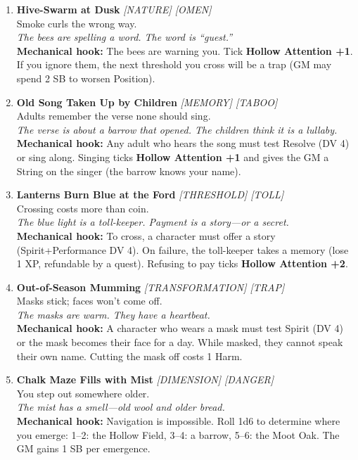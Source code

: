 \begin{enumerate}
\item \textbf{Hive-Swarm at Dusk} \hfill \textit{[NATURE] [OMEN]} \\
  Smoke curls the wrong way. \\
  \textit{The bees are spelling a word. The word is ``guest.''} \\
  \textbf{Mechanical hook:} The bees are warning you. Tick \textbf{Hollow Attention +1}. If you ignore them, the next threshold you cross will be a trap (GM may spend 2 SB to worsen Position).

\item \textbf{Old Song Taken Up by Children} \hfill \textit{[MEMORY] [TABOO]} \\
  Adults remember the verse none should sing. \\
  \textit{The verse is about a barrow that opened. The children think it is a lullaby.} \\
  \textbf{Mechanical hook:} Any adult who hears the song must test Resolve (DV 4) or sing along. Singing ticks \textbf{Hollow Attention +1} and gives the GM a String on the singer (the barrow knows your name).

\item \textbf{Lanterns Burn Blue at the Ford} \hfill \textit{[THRESHOLD] [TOLL]} \\
  Crossing costs more than coin. \\
  \textit{The blue light is a toll-keeper. Payment is a story---or a secret.} \\
  \textbf{Mechanical hook:} To cross, a character must offer a story (Spirit+Performance DV 4). On failure, the toll-keeper takes a memory (lose 1 XP, refundable by a quest). Refusing to pay ticks \textbf{Hollow Attention +2}.

\item \textbf{Out-of-Season Mumming} \hfill \textit{[TRANSFORMATION] [TRAP]} \\
  Masks stick; faces won't come off. \\
  \textit{The masks are warm. They have a heartbeat.} \\
  \textbf{Mechanical hook:} A character who wears a mask must test Spirit (DV 4) or the mask becomes their face for a day. While masked, they cannot speak their own name. Cutting the mask off costs 1 Harm.

\item \textbf{Chalk Maze Fills with Mist} \hfill \textit{[DIMENSION] [DANGER]} \\
  You step out somewhere older. \\
  \textit{The mist has a smell---old wool and older bread.} \\
  \textbf{Mechanical hook:} Navigation is impossible. Roll 1d6 to determine where you emerge: 1--2: the Hollow Field, 3--4: a barrow, 5--6: the Moot Oak. The GM gains 1 SB per emergence.


\end{enumerate}
